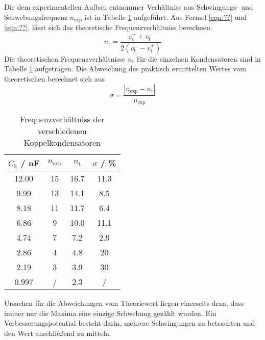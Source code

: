 Die dem experimentellen Aufbau entnommer Verhältniss aus Schwingungs- und Schwebungsfrequenz $n_\text{exp}$ ist in Tabelle \ref{tab:n} aufgeführt. Aus Formel \ref{eqn:??} und \ref{eqn:??}, lässt sich das theoretische Frequenzverhältniss berechnen.
\begin{equation}
  n_\text{t} = \frac{ v_\text{t}^+ + v_\text{t}^- }{2(v_\text{t}^- - v_\text{t}^+)}
  \label{eqn:n_t}
\end{equation}
Die theoretischen Frequenzverhältnisse $n_\text{t}$ für die einzelnen Kondensatoren sind in Tabelle \ref{tab:n} aufgetragen. Die Abweichung des praktisch ermittelten Wertes vom theoretischen berechnet sich aus
\begin{equation}
  \sigma = \frac{| n_\text{exp} - n_\text{t} |}{n_\text{exp}}
\end{equation}
\begin{table}
  \centering
  \begin{tabular}{c c c c}
    \toprule
    $C_\text{k}$ / nF & $n_\text{exp}$ & $n_\text{t}$ & $\sigma$ / \%	\\
    \midrule
    12.00	& 15	& 16.7	& 11.3	\\
    9.99	& 13 	& 14.1	& 8.5	\\
    8.18	& 11	& 11.7	& 6.4	\\
    6.86	& 9	& 10.0	& 11.1	\\
    4.74	& 7	& 7.2	& 2.9	\\
    2.86	& 4	& 4.8	& 20	\\
    2.19	& 3 	& 3.9	& 30	\\
    0.997	& /	& 2.3	& /	\\
    \bottomrule
  \end{tabular}
  \caption{Frequenzverhältniss der verschiedenen Koppelkondensatoren}
  \label{tab:n}
\end{table}
Ursachen für die Abweichungen vom Theoriewert liegen einerseits dran, dass immer nur die Maxima eine einzige Schwebung gezählt wurden. Ein Verbesserungspotential besteht darin, mehrere Schwingungen zu betrachten und den Wert anschließend zu mitteln.
